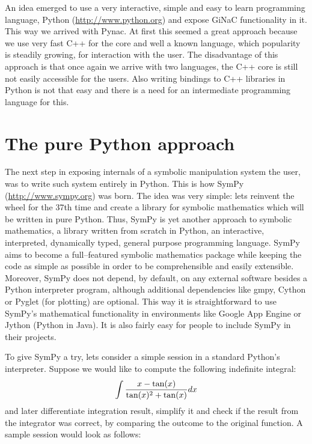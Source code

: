 An idea emerged to use a very interactive, simple and easy to learn programming language,
Python (\href{http://www.python.org}{http://www.python.org}) and expose GiNaC functionality in it. This way we arrived
with Pynac. At first this seemed a great approach because we use very fast C++ for the core
and well a known language, which popularity is steadily growing, for interaction with the user.
The disadvantage of this approach is that once again we arrive with two languages, the C++ core
is still not easily accessible for the users. Also writing bindings to C++ libraries in Python
is not that easy and there is a need for an intermediate programming language for this.


\section{The pure Python approach}

The next step in exposing internals of a symbolic manipulation system the user, was to
write such system entirely in Python. This is how SymPy (\href{http://www.sympy.org}{http://www.sympy.org}) was born.
The idea was very simple: lets reinvent the wheel for the 37th time and create a library
for symbolic mathematics which will be written in pure Python. Thus, SymPy is yet another
approach to symbolic mathematics, a library written from scratch in Python, an interactive,
interpreted, dynamically typed, general purpose programming language. SymPy aims to become
a full--featured symbolic mathematics package while keeping the code as simple as possible
in order to be comprehensible and easily extensible. Moreover, SymPy does not depend, by
default, on any external software besides a Python interpreter program, although additional
dependencies like gmpy, Cython or Pyglet (for plotting) are optional. This way it is
straightforward to use SymPy's mathematical functionality in environments like Google App
Engine or Jython (Python in Java). It is also fairly easy for people to include SymPy in
their projects.

To give SymPy a try, lets consider a simple session in a standard Python's interpreter.
Suppose we would like to compute the following indefinite integral:
\begin{gather}
\begin{split}\int \frac{x - \tan(x)}{\tan(x)^2 + \tan(x)} dx\end{split}\notag
\end{gather}
and later differentiate integration result, simplify it and check if the result from the
integrator was correct, by comparing the outcome to the original function. A sample session
would look as follows:


